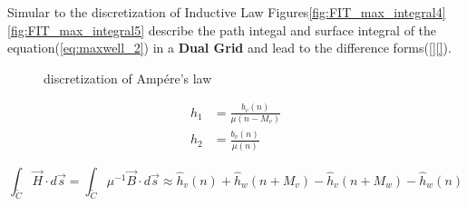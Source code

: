 Simular to the discretization of Inductive Law Figures\ref{fig:FIT_max_integral4}\ref{fig:FIT_max_integral5} describe the path integal and surface integral of the equation(\ref{eq:maxwell_2}) in a \textbf{Dual Grid} and lead to the difference forms(\ref{}\ref{}).

\begin{figure}
\hfill
\caption{discretization of Amp\'ere's law}
\end{figure}

\begin{align}
h_{1}&=\frac{b_{v}(n)}{\mu (n-M_{v})}\\
h_{2}&=\frac{b_{v}(n)}{\mu (n)}
\label{eq:megnetic_field}
\end{align}

%

\begin{equation}
\int_{\tilde{C}}\vec{H}\cdot d\vec{s}=\int_{\tilde{C}}\mu^{-1}\vec{B}\cdot d\vec{s}\approx
\widehat{h}_{v}(n)
+\widehat{h}_{w}(n+M_{v})
-\widehat{h}_{v}(n+M_{w})
-\widehat{h}_{w}(n)
\label{eq:ampere_left_sample}
\end{equation}

